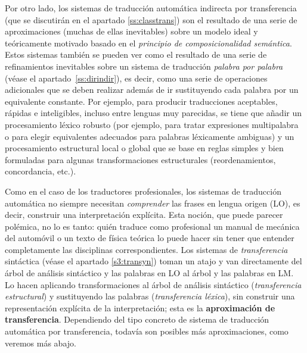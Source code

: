 Por otro lado, los sistemas de traducción automática indirecta por transferencia (que se discutirán en el apartado \ref{ss:classtrans}) son el resultado de una serie de aproximaciones (muchas de ellas inevitables) sobre un modelo ideal y teóricamente motivado basado en el \emph{principio de composicionalidad semántica}. Estos sistemas también se pueden ver como el resultado de una serie de refinamientos inevitables sobre un sistema de traducción \emph{palabra por palabra} (véase el apartado~\ref{ss:dirindir}), es decir, como una serie de operaciones adicionales que se deben realizar además de ir sustituyendo cada palabra por un equivalente constante. Por ejemplo, para producir traducciones aceptables, rápidas e inteligibles, incluso entre lenguas muy parecidas, se tiene que añadir un procesamiento léxico robusto (por ejemplo, para tratar expresiones multipalabra o para elegir equivalentes adecuados para palabras léxicamente ambiguas) y un procesamiento estructural local o global que se base en reglas simples y bien formuladas para algunas transformaciones estructurales (reordenamientos, concordancia, etc.). 

Como en el caso de los traductores profesionales, los sistemas de traducción automática no siempre necesitan \emph{comprender} las frases en lengua origen (LO), es decir, construir una interpretación explícita. Esta noción, que puede parecer polémica, no lo es tanto: quién traduce como profesional un manual de mecánica del automóvil o un texto de física teórica lo puede hacer sin tener que entender completamente las disciplinas correspondientes. Los sistemas de \emph{transferencia} sintáctica (véase el apartado \ref{s3:transyn}) toman un atajo y van directamente del árbol de análisis sintáctico y las palabras en LO al árbol y las palabras en LM. Lo hacen aplicando transformaciones al árbol de análisis sintáctico (\emph{transferencia estructural}) y sustituyendo las palabras (\emph{transferencia léxica}), sin construir una representación explícita de la interpretación; esta es la \textbf{aproximación de transferencia}. Dependiendo del tipo concreto de sistema de traducción automática por transferencia, todavía son posibles más aproximaciones, como veremos más abajo. 

